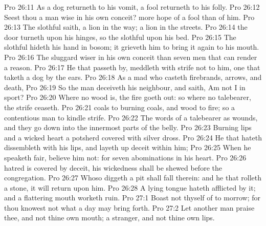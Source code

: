 \vs Pro 26:11 As a dog returneth to his vomit,  a fool returneth to his folly.
\vs Pro 26:12 Seest thou a man wise in his own conceit?  more hope of a fool than of him.
\vs Pro 26:13 The slothful  saith,  a lion in the way; a lion  in the streets.
\vs Pro 26:14  the door turneth upon his hinges, so  the slothful upon his bed.
\vs Pro 26:15 The slothful hideth his hand in  bosom; it grieveth him to bring it again to his mouth.
\vs Pro 26:16 The sluggard  wiser in his own conceit than seven men that can render a reason.
\vs Pro 26:17 He that passeth by,  meddleth with strife  not to him,  one that taketh a dog by the ears.
\vs Pro 26:18 As a mad  who casteth firebrands, arrows, and death,
\vs Pro 26:19 So  the man  deceiveth his neighbour, and saith, Am not I in sport?
\vs Pro 26:20 Where no wood is,  the fire goeth out: so where  no talebearer, the strife ceaseth.
\vs Pro 26:21  coals  to burning coals, and wood to fire; so  a contentious man to kindle strife.
\vs Pro 26:22 The words of a talebearer  as wounds, and they go down into the innermost parts of the belly.
\vs Pro 26:23 Burning lips and a wicked heart  a potsherd covered with silver dross.
\vs Pro 26:24 He that hateth dissembleth with his lips, and layeth up deceit within him;
\vs Pro 26:25 When he speaketh fair, believe him not: for  seven abominations in his heart.
\vs Pro 26:26  hatred is covered by deceit, his wickedness shall be shewed before the  congregation.
\vs Pro 26:27 Whoso diggeth a pit shall fall therein: and he that rolleth a stone, it will return upon him.
\vs Pro 26:28 A lying tongue hateth  afflicted by it; and a flattering mouth worketh ruin.
\vs Pro 27:1 Boast not thyself of to morrow; for thou knowest not what a day may bring forth.
\vs Pro 27:2 Let another man praise thee, and not thine own mouth; a stranger, and not thine own lips.
